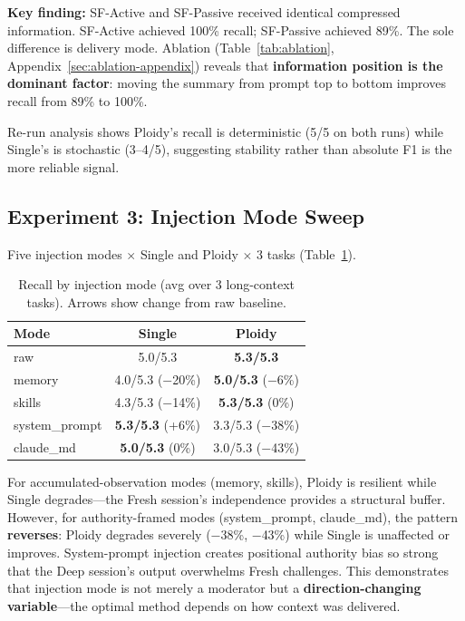 \documentclass{article}
\begin{document}
\textbf{Key finding:} SF-Active and SF-Passive received identical compressed information. SF-Active achieved 100\% recall; SF-Passive achieved 89\%. The sole difference is delivery mode. Ablation (Table~\ref{tab:ablation}, Appendix~\ref{sec:ablation-appendix}) reveals that \textbf{information position is the dominant factor}: moving the summary from prompt top to bottom improves recall from 89\% to 100\%.

Re-run analysis shows Ploidy's recall is deterministic (5/5 on both runs) while Single's is stochastic (3--4/5), suggesting stability rather than absolute F1 is the more reliable signal.

\subsection{Experiment 3: Injection Mode Sweep}
\label{sec:injection-sweep}

Five injection modes $\times$ Single and Ploidy $\times$ 3 tasks (Table~\ref{tab:injection}).

\begin{table}[t]
\centering
\caption{Recall by injection mode (avg over 3 long-context tasks). Arrows show change from raw baseline.}
\label{tab:injection}
\footnotesize
\begin{tabular}{@{}lcc@{}}
\toprule
\textbf{Mode} & \textbf{Single} & \textbf{Ploidy} \\
\midrule
raw & 5.0/5.3 & \textbf{5.3/5.3} \\
memory & 4.0/5.3 \scriptsize{($-$20\%)} & \textbf{5.0/5.3} \scriptsize{($-$6\%)} \\
skills & 4.3/5.3 \scriptsize{($-$14\%)} & \textbf{5.3/5.3} \scriptsize{(0\%)} \\
system\_prompt & \textbf{5.3/5.3} \scriptsize{(+6\%)} & 3.3/5.3 \scriptsize{($-$38\%)} \\
claude\_md & \textbf{5.0/5.3} \scriptsize{(0\%)} & 3.0/5.3 \scriptsize{($-$43\%)} \\
\bottomrule
\end{tabular}
\end{table}

For accumulated-observation modes (memory, skills), Ploidy is resilient while Single degrades---the Fresh session's independence provides a structural buffer. However, for authority-framed modes (system\_prompt, claude\_md), the pattern \textbf{reverses}: Ploidy degrades severely ($-$38\%, $-$43\%) while Single is unaffected or improves. System-prompt injection creates positional authority bias so strong that the Deep session's output overwhelms Fresh challenges. This demonstrates that injection mode is not merely a moderator but a \textbf{direction-changing variable}---the optimal method depends on how context was delivered.
\end{document}
